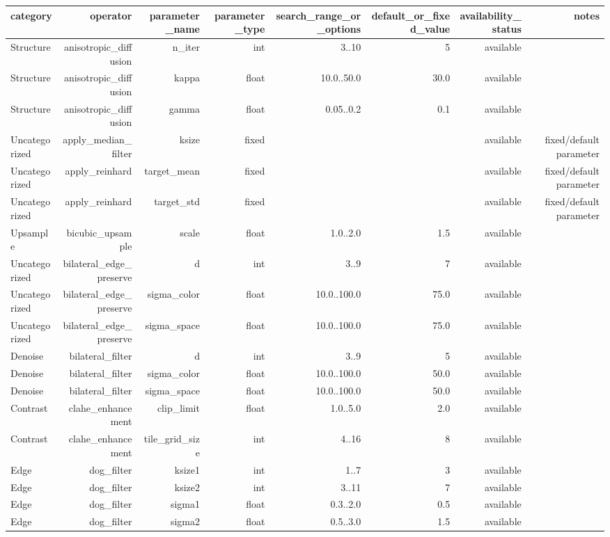 \begin{tabular}{lrrrrrrr}
\hline
category & operator & parameter\_name & parameter\_type & search\_range\_or\_options & default\_or\_fixed\_value & availability\_status & notes \\
\hline
Structure & anisotropic\_diffusion & n\_iter & int & 3..10 & 5 & available &  \\
Structure & anisotropic\_diffusion & kappa & float & 10.0..50.0 & 30.0 & available &  \\
Structure & anisotropic\_diffusion & gamma & float & 0.05..0.2 & 0.1 & available &  \\
Uncategorized & apply\_median\_filter & ksize & fixed &  &  & available & fixed/default parameter \\
Uncategorized & apply\_reinhard & target\_mean & fixed &  &  & available & fixed/default parameter \\
Uncategorized & apply\_reinhard & target\_std & fixed &  &  & available & fixed/default parameter \\
Upsample & bicubic\_upsample & scale & float & 1.0..2.0 & 1.5 & available &  \\
Uncategorized & bilateral\_edge\_preserve & d & int & 3..9 & 7 & available &  \\
Uncategorized & bilateral\_edge\_preserve & sigma\_color & float & 10.0..100.0 & 75.0 & available &  \\
Uncategorized & bilateral\_edge\_preserve & sigma\_space & float & 10.0..100.0 & 75.0 & available &  \\
Denoise & bilateral\_filter & d & int & 3..9 & 5 & available &  \\
Denoise & bilateral\_filter & sigma\_color & float & 10.0..100.0 & 50.0 & available &  \\
Denoise & bilateral\_filter & sigma\_space & float & 10.0..100.0 & 50.0 & available &  \\
Contrast & clahe\_enhancement & clip\_limit & float & 1.0..5.0 & 2.0 & available &  \\
Contrast & clahe\_enhancement & tile\_grid\_size & int & 4..16 & 8 & available &  \\
Edge & dog\_filter & ksize1 & int & 1..7 & 3 & available &  \\
Edge & dog\_filter & ksize2 & int & 3..11 & 7 & available &  \\
Edge & dog\_filter & sigma1 & float & 0.3..2.0 & 0.5 & available &  \\
Edge & dog\_filter & sigma2 & float & 0.5..3.0 & 1.5 & available &  \\

\end{tabular}
